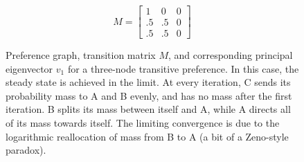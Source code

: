 \begin{figure}[!htb] %
\centering
\begin{minipage}{1.2in}
\end{minipage}
\hfill
\begin{minipage}{1.2in}
\[
M=
  \begin{bmatrix}
    1 & 0 & 0 \\
    .5 & .5 & 0 \\
    .5 & .5 & 0
  \end{bmatrix}
\]
\end{minipage}
\hfill
\begin{minipage}{1.2in}
\end{minipage}
\caption{Preference graph, transition matrix $M$, and corresponding principal eigenvector $v_1$ for a three-node transitive preference. In this case, the steady state is achieved in the limit. At every iteration, C sends its probability mass to A and B evenly, and has no mass after the first iteration. B splits its mass between itself and A, while A directs all of its mass towards itself. The limiting convergence is due to the logarithmic reallocation of mass from B to A (a bit of a Zeno-style paradox).}
\label{fig:linalg_3} 
\end{figure}



